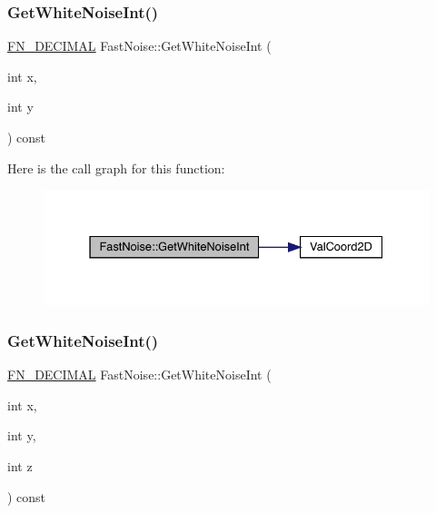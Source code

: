 \subsubsection{\texorpdfstring{Get\+White\+Noise\+Int()}{GetWhiteNoiseInt()}\hspace{0.1cm}{\footnotesize\ttfamily [1/3]}}
{\footnotesize\ttfamily \mbox{\hyperlink{_fast_noise_8h_a75a9ef6d2541c4921815b885bfd449c3}{F\+N\+\_\+\+D\+E\+C\+I\+M\+AL}} Fast\+Noise\+::\+Get\+White\+Noise\+Int (\begin{DoxyParamCaption}\item[{int}]{x,  }\item[{int}]{y }\end{DoxyParamCaption}) const}

Here is the call graph for this function\+:
\nopagebreak
\begin{figure}[H]
\begin{center}
\leavevmode
\includegraphics[width=331pt]{class_fast_noise_a7a9d98438239800363188c7219bb26bc_cgraph}
\end{center}
\end{figure}
\mbox{\label{class_fast_noise_a1c0a782e7675a58f6fe777eb6fa06eaf}} 
\subsubsection{\texorpdfstring{Get\+White\+Noise\+Int()}{GetWhiteNoiseInt()}\hspace{0.1cm}{\footnotesize\ttfamily [2/3]}}
{\footnotesize\ttfamily \mbox{\hyperlink{_fast_noise_8h_a75a9ef6d2541c4921815b885bfd449c3}{F\+N\+\_\+\+D\+E\+C\+I\+M\+AL}} Fast\+Noise\+::\+Get\+White\+Noise\+Int (\begin{DoxyParamCaption}\item[{int}]{x,  }\item[{int}]{y,  }\item[{int}]{z }\end{DoxyParamCaption}) const}

